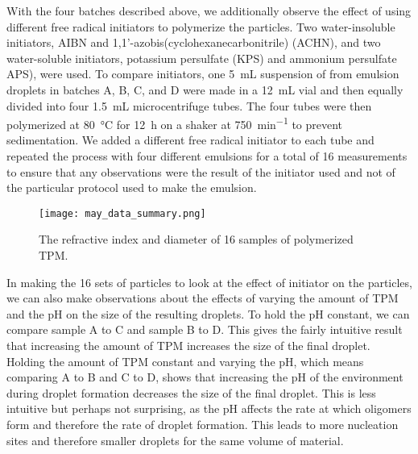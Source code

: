 

With the four batches described above, we additionally observe the effect of using
different free radical initiators to polymerize the particles.
Two water-insoluble initiators, AIBN and
\num{1},\num{1}'-azobis(cyclohexanecarbonitrile) (ACHN), and two water-soluble 
initiators, potassium persulfate (KPS) and ammonium persulfate APS), were 
used. To compare initiators, one \SI{5}{\milli \liter} suspension of from emulsion droplets
in batches A, B, C, and D were 
made in a \SI{12}{\milli \liter} vial and then equally divided into four %
\SI{1.5}{\milli \liter} microcentrifuge tubes.
The four tubes were then polymerized at \SI{80}{\celsius} 
for \SI{12}{\hour} on a shaker at \SI{750}{\minute^{-1}} %
to prevent sedimentation.
We added a different free radical initiator to each tube and repeated the process with four
different emulsions for a total of 
\num{16} measurements to ensure that any observations were the result of the 
initiator used and not of the particular protocol used to make the emulsion.

\begin{figure}
    \centering
    \texttt{[image: may\_data\_summary.png]}
    \caption{The refractive index and diameter of 16 samples of 
    polymerized TPM.}
    \label{fig:initiator_data}
\end{figure}

In making the \si{16} sets of particles to look at the effect of initiator on 
the particles, we can also make observations about the effects of varying 
the amount of TPM and the pH on the size of the resulting droplets. To hold 
the pH constant, we can compare sample A to C and sample B to D. This gives 
the fairly intuitive result that increasing the amount of TPM increases the 
size of the final droplet. Holding the amount of TPM constant and varying 
the pH, which means comparing A to B and C to D, shows that increasing the 
pH of the environment during droplet formation decreases the size of the 
final droplet. This is less intuitive but perhaps not surprising, as the pH 
affects the rate at which oligomers form and therefore the rate of droplet 
formation. This leads to more nucleation sites and therefore smaller droplets 
for the same volume of material. 

